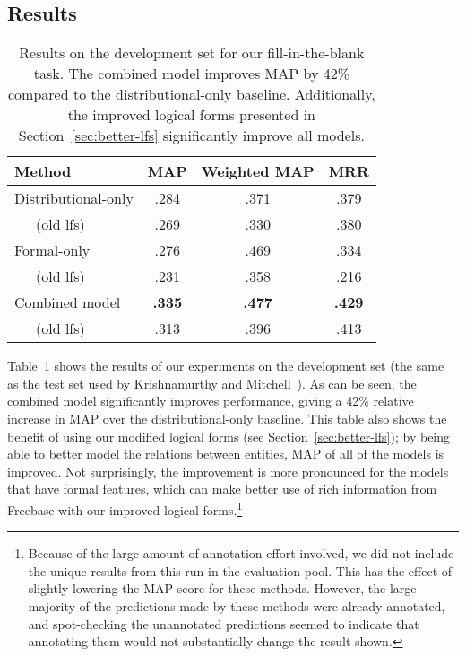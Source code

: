 \documentclass[11pt]{article}
\newcommand{\secref}[1]{Section~\ref{sec:#1}}
\newcommand{\tabref}[1]{Table~\ref{tab:#1}}
\begin{document}
\subsection{Results}

\begin{table}
  \centering
  {\small
    \begin{tabular}{lccc}
      \toprule
      Method & MAP & Weighted MAP & MRR \\
      \midrule
      Distributional-only & .284 & .371 & .379 \\
      \ \ \ (old lfs) & .269 & .330 & .380 \\
      \midrule
      Formal-only & .276 & .469 & .334 \\
      \ \ \ (old lfs) & .231 & .358 & .216 \\
      \midrule
      Combined model & \textbf{.335} & \textbf{.477} & \textbf{.429} \\
      \ \ \ (old lfs) & .313 & .396 & .413 \\
      \bottomrule
    \end{tabular}
  }
  \caption{Results on the development set for our fill-in-the-blank task.  The
  combined model improves MAP by 42\% compared to the distributional-only
  baseline.  Additionally, the improved logical forms presented in
  \secref{better-lfs} significantly improve all models.}
  \label{tab:dev-results}
\end{table}

\tabref{dev-results} shows the results of our experiments on the development
set (the same as the test set used by Krishnamurthy and
Mitchell~).  As can be
seen, the combined model significantly improves performance, giving a 42\%
relative increase in MAP over the distributional-only baseline.  This table
also shows the benefit of using our modified logical forms (see
\secref{better-lfs}); by being able to better model the relations between
entities, MAP of all of the models is improved.  Not surprisingly, the
improvement is more pronounced for the models that have formal features, which
can make better use of rich information from Freebase with our improved logical
forms.\footnote{Because of the large amount of annotation effort involved, we
did not include the unique results from this run in the evaluation pool.  This
has the effect of slightly lowering the MAP score for these methods.  However,
the large majority of the predictions made by these methods were already
annotated, and spot-checking the unannotated predictions seemed to indicate
that annotating them would not substantially change the result shown.}
\end{document}
